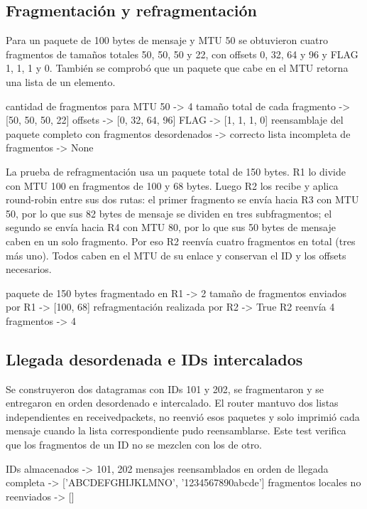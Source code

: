 \documentclass[
	spanish, %
	letterpaper, oneside
]{article}
\newcommand{\codeunderscore}{\textunderscore\allowbreak}
\newcommand{\code}[1]{{\let\_\codeunderscore#1}}     %
\begin{document}
\subsection{Fragmentación y refragmentación}
Para un paquete de 100 bytes de mensaje y MTU 50 se obtuvieron cuatro fragmentos de tamaños totales 50, 50, 50 y 22, con offsets 0, 32, 64 y 96 y FLAG 1, 1, 1 y 0. También se comprobó que un paquete que cabe en el MTU retorna una lista de un elemento.
\begin{salida}
cantidad de fragmentos para MTU 50 -> 4
tamaño total de cada fragmento -> [50, 50, 50, 22]
offsets -> [0, 32, 64, 96]
FLAG -> [1, 1, 1, 0]
reensamblaje del paquete completo con fragmentos desordenados -> correcto
lista incompleta de fragmentos -> None
\end{salida}

La prueba de refragmentación usa un paquete total de 150 bytes. R1 lo divide con MTU 100 en fragmentos de 100 y 68 bytes. Luego R2 los recibe y aplica round-robin entre sus dos rutas: el primer fragmento se envía hacia R3 con MTU 50, por lo que sus 82 bytes de mensaje se dividen en tres subfragmentos; el segundo se envía hacia R4 con MTU 80, por lo que sus 50 bytes de mensaje caben en un solo fragmento. Por eso R2 reenvía cuatro fragmentos en total (tres más uno). Todos caben en el MTU de su enlace y conservan el ID y los offsets necesarios.
\begin{salida}
paquete de 150 bytes fragmentado en R1 -> 2
tamaño de fragmentos enviados por R1 -> [100, 68]
refragmentación realizada por R2 -> True
R2 reenvía 4 fragmentos -> 4
\end{salida}

\subsection{Llegada desordenada e IDs intercalados}
Se construyeron dos datagramas con IDs 101 y 202, se fragmentaron y se entregaron en orden desordenado e intercalado. El router mantuvo dos listas independientes en \code{received\_packets}, no reenvió esos paquetes y solo imprimió cada mensaje cuando la lista correspondiente pudo reensamblarse. Este test verifica que los fragmentos de un ID no se mezclen con los de otro.
\begin{salida}
IDs almacenados -> {101, 202}
mensajes reensamblados en orden de llegada completa ->
['ABCDEFGHIJKLMNO', '1234567890abcde']
fragmentos locales no reenviados -> []
\end{salida}
\end{document}
